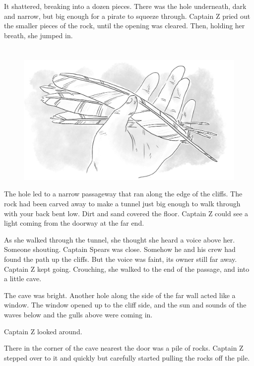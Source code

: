 \documentclass[12pt]{extbook}
\begin{document}
  It shattered, breaking into a dozen pieces. There was the hole
  underneath, dark and narrow, but big enough for a pirate to squeeze
  through. Captain Z pried out the smaller pieces of the rock, until the
  opening was cleared. Then, holding her breath, she jumped in.
  
  \section{}\label{section-19}
  
  \begin{figure}[htbp]
  \centering
  \includegraphics{img/hand_and_feathers.png}
  \caption{}
  \end{figure}
  
  The hole led to a narrow passageway that ran along the edge of the
  cliffs. The rock had been carved away to make a tunnel just big enough
  to walk through with your back bent low. Dirt and sand covered the
  floor. Captain Z could see a light coming from the doorway at the far
  end.
  
  As she walked through the tunnel, she thought she heard a voice above
  her. Someone shouting. Captain Spears was close. Somehow he and his crew
  had found the path up the cliffs. But the voice was faint, its owner
  still far away. Captain Z kept going. Crouching, she walked to the end
  of the passage, and into a little cave.
  
  The cave was bright. Another hole along the side of the far wall acted
  like a window. The window opened up to the cliff side, and the sun and
  sounds of the waves below and the gulls above were coming in.
  
  Captain Z looked around.
  
  There in the corner of the cave nearest the door was a pile of rocks.
  Captain Z stepped over to it and quickly but carefully started pulling
  the rocks off the pile.
  
\end{document}
